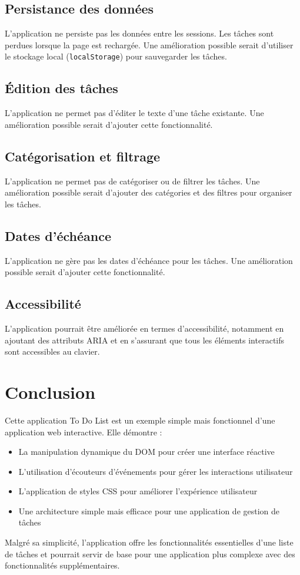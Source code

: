 \documentclass{article}
\begin{document}
\subsection{Persistance des données}
L'application ne persiste pas les données entre les sessions. Les tâches sont perdues lorsque la page est rechargée. Une amélioration possible serait d'utiliser le stockage local (\texttt{localStorage}) pour sauvegarder les tâches.

\subsection{Édition des tâches}
L'application ne permet pas d'éditer le texte d'une tâche existante. Une amélioration possible serait d'ajouter cette fonctionnalité.

\subsection{Catégorisation et filtrage}
L'application ne permet pas de catégoriser ou de filtrer les tâches. Une amélioration possible serait d'ajouter des catégories et des filtres pour organiser les tâches.

\subsection{Dates d'échéance}
L'application ne gère pas les dates d'échéance pour les tâches. Une amélioration possible serait d'ajouter cette fonctionnalité.

\subsection{Accessibilité}
L'application pourrait être améliorée en termes d'accessibilité, notamment en ajoutant des attributs ARIA et en s'assurant que tous les éléments interactifs sont accessibles au clavier.

\section{Conclusion}
Cette application To Do List est un exemple simple mais fonctionnel d'une application web interactive. Elle démontre :
\begin{itemize}
    \item La manipulation dynamique du DOM pour créer une interface réactive
    \item L'utilisation d'écouteurs d'événements pour gérer les interactions utilisateur
    \item L'application de styles CSS pour améliorer l'expérience utilisateur
    \item Une architecture simple mais efficace pour une application de gestion de tâches
\end{itemize}

Malgré sa simplicité, l'application offre les fonctionnalités essentielles d'une liste de tâches et pourrait servir de base pour une application plus complexe avec des fonctionnalités supplémentaires.
\end{document}
